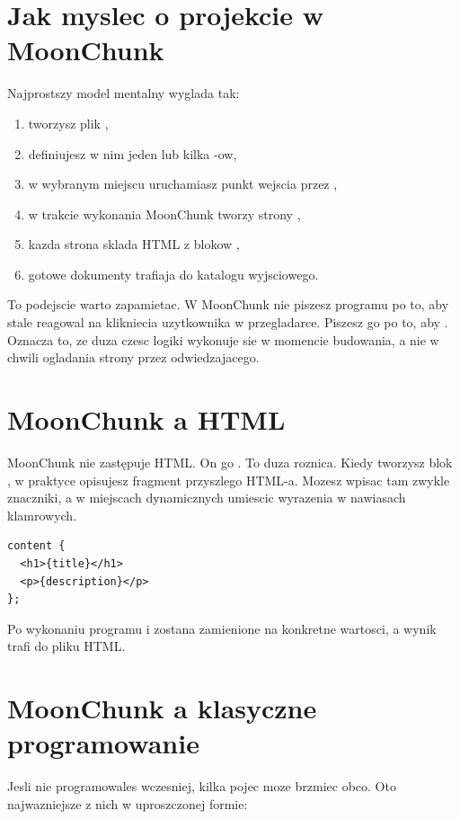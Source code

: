 \section{Jak myslec o projekcie w MoonChunk}
Najprostszy model mentalny wyglada tak:

\begin{enumerate}
  \item tworzysz plik ,
  \item definiujesz w nim jeden lub kilka -ow,
  \item w wybranym miejscu uruchamiasz punkt wejscia przez ,
  \item w trakcie wykonania MoonChunk tworzy strony ,
  \item kazda strona sklada HTML z blokow ,
  \item gotowe dokumenty trafiaja do katalogu wyjsciowego.
\end{enumerate}

To podejscie warto zapamietac. W MoonChunk nie piszesz programu po to, aby stale
reagowal na klikniecia uzytkownika w przegladarce. Piszesz go po to, aby
. Oznacza to, ze duza czesc logiki wykonuje sie
w momencie budowania, a nie w chwili ogladania strony przez odwiedzajacego.

\section{MoonChunk a HTML}
MoonChunk nie zastępuje HTML. On go . To duza roznica.
Kiedy tworzysz blok , w praktyce opisujesz fragment przyszlego
HTML-a. Mozesz wpisac tam zwykle znaczniki, a w miejscach dynamicznych umiescic
wyrazenia w nawiasach klamrowych.

\begin{lstlisting}[style=moonchunk,caption={Fragment dynamicznego HTML w MoonChunk}]
content {
  <h1>{title}</h1>
  <p>{description}</p>
};
\end{lstlisting}

Po wykonaniu programu  i  zostana zamienione na konkretne
wartosci, a wynik trafi do pliku HTML.

\section{MoonChunk a klasyczne programowanie}
Jesli nie programowales wczesniej, kilka pojec moze brzmiec obco. Oto najwazniejsze
z nich w uproszczonej formie:

